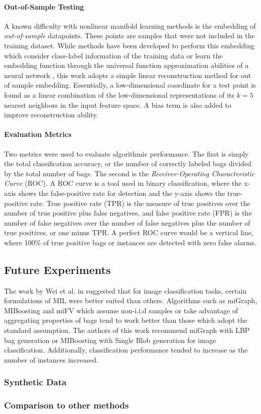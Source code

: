 \paragraph{Out-of-Sample Testing}
A known difficulty with nonlinear manifold learning methods is the embedding of \textit{out-of-sample} datapoints.  These points are samples that were not included in the training  dataset.  While methods have been developed to perform this embedding which consider class-label information of the training data or learn the embedding function through the universal function approximation abilities of a neural network \cite{Vural2016OutOfSampleSupManifoldLearning,Mendoza2016ELMOutOfSample}, this work adopts a simple linear reconstruction method for out of sample embedding.  Essentially, a low-dimensional coordinate for a test point is found as a linear combination of the low-dimensional representations of its $k=5$ nearest neighbors in the input feature space.  A bias term is also added to improve reconstruction ability.  


\paragraph{Evaluation Metrics}
Two metrics were used to evaluate algorithmic performance.  The first is simply the total classification accuracy, or the number of correctly labeled bags divided by the total number of bags.  The second is the \textit{Receiver-Operating Characteristic Curve} (ROC).  A ROC curve is a tool used in binary classification, where the x-axis shows the false-positive rate for detection and the y-axis shows the true-positive rate.  True positive rate (TPR) is the measure of true positives over the number of true positive plus false negatives, and false positive rate (FPR) is the number  of false negatives over the number of false negatives plus the number of true positives, or one minus TPR.  A perfect ROC curve would be a vertical line, where 100\% of true positive bags or instances are detected with zero false alarms.


\subsection{Future Experiments}

The work by Wei et al. in \cite{Wei2016ImageBagGenerators} suggested that  for image classification tasks, certain formulations of MIL were better suited than others.  Algorithms such as miGraph, MIBoosting and miFV which assume non-i.i.d samples or take advantage of aggregating properties of bags tend to work better than those which adopt the standard assumption.  The authors of this work recommend miGraph with LBP bag generation or MIBoosting with Single Blob generation for image classification.  Additionally, classification performance tended to increase as the number of instances increased.

\subsubsection{Synthetic Data}

\subsubsection{Comparison to other methods}